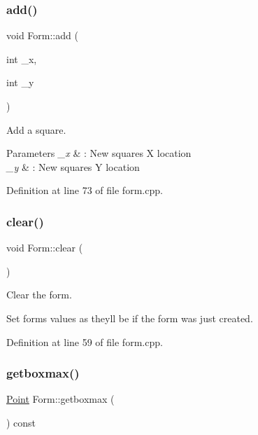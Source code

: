 \hypertarget{class_form_a19fd6c5ca1ee574ca45af9c620d0c3da}{}\label{class_form_a19fd6c5ca1ee574ca45af9c620d0c3da} 
\subsubsection{\texorpdfstring{add()}{add()}\hspace{0.1cm}{\footnotesize\ttfamily [2/2]}}
{\footnotesize\ttfamily void Form\+::add (\begin{DoxyParamCaption}\item[{int}]{\+\_\+x,  }\item[{int}]{\+\_\+y }\end{DoxyParamCaption})}



Add a square. 


\begin{DoxyParams}{Parameters}
{\em \+\_\+x} & \+: New square\textquotesingle{}s X location \\
\hline
{\em \+\_\+y} & \+: New square\textquotesingle{}s Y location \\
\hline
\end{DoxyParams}


Definition at line 73 of file form.\+cpp.

\hypertarget{class_form_a567c4924cf20b2e856f60851c821f4fe}{}\label{class_form_a567c4924cf20b2e856f60851c821f4fe} 
\subsubsection{\texorpdfstring{clear()}{clear()}}
{\footnotesize\ttfamily void Form\+::clear (\begin{DoxyParamCaption}{ }\end{DoxyParamCaption})}



Clear the form. 

Set form\textquotesingle{}s values as they\textquotesingle{}ll be if the form was just created. 

Definition at line 59 of file form.\+cpp.

\hypertarget{class_form_aaffcebdc148fd9ebf84fedcba0849ab4}{}\label{class_form_aaffcebdc148fd9ebf84fedcba0849ab4} 
\subsubsection{\texorpdfstring{getboxmax()}{getboxmax()}}
{\footnotesize\ttfamily \hyperlink{struct_point}{Point} Form\+::getboxmax (\begin{DoxyParamCaption}{ }\end{DoxyParamCaption}) const}




